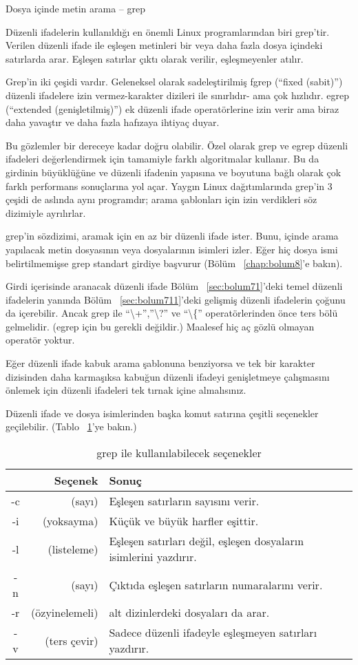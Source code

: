 \begin{section}{Dosya içinde metin arama – grep}

Düzenli ifadelerin kullanıldığı en önemli Linux programlarından biri grep’tir. Verilen düzenli ifade ile eşleşen metinleri bir veya daha fazla dosya içindeki satırlarda arar. Eşleşen satırlar çıktı olarak verilir, eşleşmeyenler atılır.

Grep’in iki çeşidi vardır. Geleneksel olarak sadeleştirilmiş fgrep (“fixed (sabit)”) düzenli ifadelere izin vermez-karakter dizileri ile sınırlıdır- ama çok hızlıdır. egrep (“extended (genişletilmiş)”) ek düzenli ifade operatörlerine izin verir ama biraz daha yavaştır ve daha fazla hafızaya ihtiyaç duyar.

Bu gözlemler bir dereceye kadar doğru olabilir. Özel olarak grep ve egrep düzenli ifadeleri değerlendirmek için tamamiyle farklı algoritmalar kullanır. Bu da girdinin büyüklüğüne ve düzenli ifadenin yapısına ve boyutuna bağlı olarak çok farklı performans sonuçlarına yol açar. Yaygın Linux dağıtımlarında grep'in 3 çeşidi de aslında aynı programdır; arama şablonları için izin verdikleri söz dizimiyle ayrılırlar.

grep’in sözdizimi, aramak için en az bir düzenli ifade ister. Bunu, içinde arama yapılacak metin dosyasının veya dosyalarının isimleri izler. Eğer hiç dosya ismi belirtilmemişse grep standart girdiye başvurur (Bölüm ~\ref{chap:bolum8}’e bakın).

Girdi içerisinde aranacak düzenli ifade Bölüm ~\ref{sec:bolum71}’deki temel düzenli ifadelerin yanında Bölüm ~\ref{sec:bolum711}'deki gelişmiş düzenli ifadelerin çoğunu da içerebilir. Ancak grep ile “\textbackslash +”,”\textbackslash ?” ve “\textbackslash \{” operatörlerinden önce ters bölü gelmelidir. (egrep için bu gerekli değildir.) Maalesef hiç aç gözlü olmayan operatör yoktur.

Eğer düzenli ifade kabuk arama şablonuna benziyorsa ve tek bir karakter dizisinden daha karmaşıksa kabuğun düzenli ifadeyi genişletmeye çalışmasını önlemek için düzenli ifadeleri tek tırnak içine almalısınız.

Düzenli ifade ve dosya isimlerinden başka komut satırına çeşitli seçenekler geçilebilir. (Tablo ~\ref{tab:7.2}’ye bakın.)

\begin {table}[htb]
\caption {grep ile kullanılabilecek seçenekler} \label{tab:7.2}
\begin{tabular}{c r l}
\hline
{} & Seçenek & Sonuç\\
\hline
-c & (sayı) & Eşleşen satırların sayısını verir.\\
-i & (yoksayma)	& Küçük ve büyük harfler eşittir.\\
-l & (listeleme) & Eşleşen satırları değil, eşleşen dosyaların isimlerini yazdırır.\\
-n & (sayı) & Çıktıda eşleşen satırların numaralarını verir.\\
-r & (özyinelemeli) & alt dizinlerdeki dosyaları da arar.\\
-v & (ters çevir) & Sadece düzenli ifadeyle eşleşmeyen satırları yazdırır.\\
\hline
\end{tabular}
\end {table}


\end{section}
